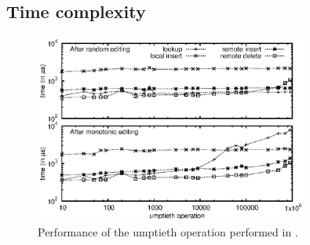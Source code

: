\subsection{Time complexity}

\begin{figure}
  \centering
  \includegraphics[width=0.8\textwidth]{./img/time.eps}
  \caption{\label{fig:time} Performance of the umptieth operation performed in
    \LSEQ.}
\end{figure}

